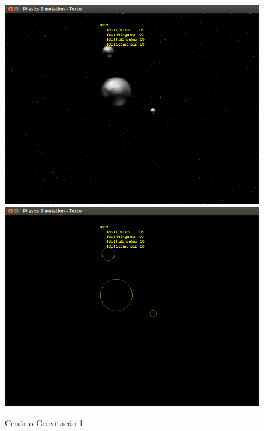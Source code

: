   \begin{figure}[H]
	\centering
    \includegraphics[scale=0.4]{images/cenario-gravitacao-2.png}
    \includegraphics[scale=0.4]{images/cenario-gravitacao.png}
	\caption{Cenário Gravitacão 1}
  \end{figure}

